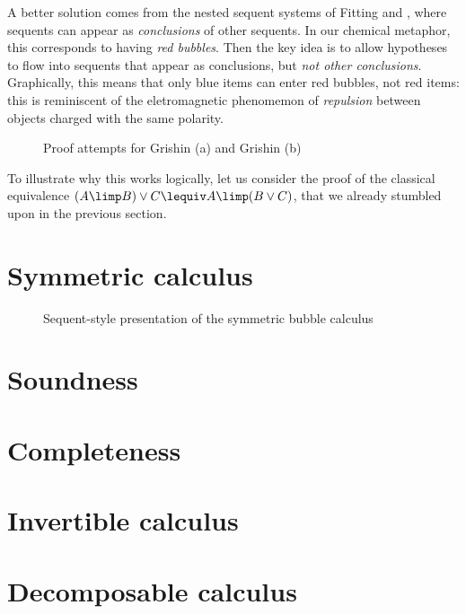A better solution comes from the nested sequent systems of Fitting
 and ,
where sequents can appear as \emph{conclusions} of other sequents. In our
chemical metaphor, this corresponds to having \emph{red bubbles}. Then the key
idea is to allow hypotheses to flow into sequents that appear as
conclusions, but \emph{not other conclusions}.
Graphically, this means that only blue items can enter red bubbles, not red
items: this is reminiscent of the eletromagnetic phenomemon of \emph{repulsion}
between objects charged with the same polarity.

\begin{figure*}
  
  \caption{Proof attempts for Grishin (a) and Grishin (b)}
\end{figure*}

To illustrate why this works logically, let us consider the proof of the
classical equivalence $ (A \limp B) \lor C \lequiv A \limp (B \lor C)$, that we
already stumbled upon in the previous section. 


\section{Symmetric calculus}

\begin{figure*}
  
  \caption{Sequent-style presentation of the symmetric bubble calculus }
\end{figure*}

\section{Soundness}

\section{Completeness}

\section{Invertible calculus}

\section{Decomposable calculus}

